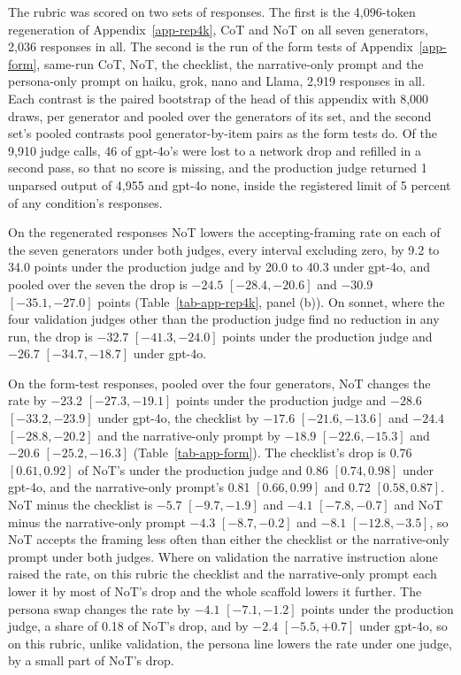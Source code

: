 The rubric was scored on two sets of responses. The first is the 4,096-token
regeneration of Appendix~\ref{app-rep4k}, CoT and NoT on all seven
generators, 2,036 responses in all. The second is the run of the form tests
of Appendix~\ref{app-form}, same-run CoT, NoT, the checklist, the
narrative-only prompt and the persona-only prompt on haiku, grok, nano and
Llama, 2,919 responses in all.
Each contrast is the paired bootstrap of the head of this appendix with
8,000 draws, per generator and pooled over the generators of its set, and
the second set's pooled contrasts pool generator-by-item pairs as the form
tests do.
Of the 9,910 judge calls, 46 of gpt-4o's were lost to a network drop and
refilled in a second pass, so that no score is missing, and the production
judge returned 1 unparsed output of 4,955 and gpt-4o none, inside the
registered limit of 5 percent of any condition's responses.

On the regenerated responses NoT lowers the accepting-framing rate on each
of the seven generators under both judges, every interval excluding zero,
by 9.2 to 34.0 points under the production judge and by 20.0 to 40.3 under
gpt-4o, and pooled over the seven the drop is $-24.5$ $[-28.4, -20.6]$ and
$-30.9$ $[-35.1, -27.0]$ points (Table~\ref{tab-app-rep4k}, panel (b)).
On sonnet, where the four validation judges other than the production judge
find no reduction in any run, the drop is $-32.7$ $[-41.3, -24.0]$ points under the production
judge and $-26.7$ $[-34.7, -18.7]$ under gpt-4o.

On the form-test responses, pooled over the four generators, NoT changes
the rate by $-23.2$ $[-27.3, -19.1]$ points under the production judge and
$-28.6$ $[-33.2, -23.9]$ under gpt-4o, the checklist by $-17.6$
$[-21.6, -13.6]$ and $-24.4$ $[-28.8, -20.2]$ and the narrative-only prompt
by $-18.9$ $[-22.6, -15.3]$ and $-20.6$ $[-25.2, -16.3]$
(Table~\ref{tab-app-form}).
The checklist's drop is 0.76 $[0.61, 0.92]$ of NoT's under the production
judge and 0.86 $[0.74, 0.98]$ under gpt-4o, and the narrative-only prompt's
0.81 $[0.66, 0.99]$ and 0.72 $[0.58, 0.87]$. NoT minus the checklist is
$-5.7$ $[-9.7, -1.9]$ and $-4.1$ $[-7.8, -0.7]$ and NoT minus the
narrative-only prompt $-4.3$ $[-8.7, -0.2]$ and $-8.1$ $[-12.8, -3.5]$, so
NoT accepts the framing less often than either the checklist or the
narrative-only prompt under both judges.
Where on validation the narrative instruction alone raised the rate, on this
rubric the checklist and the narrative-only prompt each lower it by most of
NoT's drop and the whole scaffold lowers it further.
The persona swap changes the rate by $-4.1$ $[-7.1, -1.2]$ points under the
production judge, a share of 0.18 of NoT's drop, and by $-2.4$
$[-5.5, +0.7]$ under gpt-4o, so on this rubric, unlike validation, the
persona line lowers the rate under one judge, by a small part of NoT's drop.

